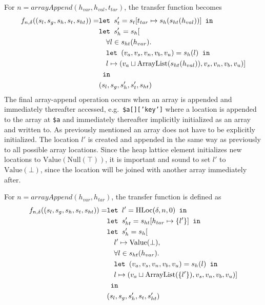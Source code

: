For $n = \mathit{arrayAppend}(h_{var}, h_{val},t_{tar})$, the transfer function becomes
\begin{align}
    f_{n,\delta}((s_l, s_g, s_h, s_t, s_{ht})) = &\texttt{let } s_t' = s_t[t_{tar}\mapsto s_h(s_{ht}(h_{val}))] \texttt{ in }\notag\\
                              &\texttt{let } s_h' = s_h[\notag\\
                              &\quad \forall l \in s_{ht}(h_{var}).\notag\\
                              &\quad\texttt{let } (v_a,v_s,v_n,v_b,v_u) = s_h(l) \texttt{ in } \notag\\
                              &\quad l\mapsto (v_a \sqcup \text{ArrayList}(s_{ht}(h_{val})), v_s, v_n, v_b, v_u)]\notag\\
                              & \texttt{ in }\notag\\
                              &(s_l, s_g, s_h', s_t', s_{ht})
\end{align}
The final array-append operation occurs when an array is appended and immediately thereafter accessed, e.g.\ \texttt{\$a[]['key']} where a location is appended to the array at \texttt{\$a} and immediately  thereafter implicitly initialized as an array and written to. As previously mentioned an array does not have to be explicitly initialized. The location $l'$ is created and appended in the same way as previously to all possible array locations. Since the heap lattice element initializes new locations to $\text{Value}(\text{Null}(\top))$, it is important and sound to set $l'$ to $\text{Value}(\bot)$, since the location will be joined with another array immediately after. 

For $n = \mathit{arrayAppend}(h_{var}, h_{tar})$, the transfer function is defined as
\begin{align}
    f_{n,\delta}((s_l, s_g, s_h, s_t, s_{ht})) = &\texttt{let } l' = \text{HLoc}(\delta, n, 0) \texttt{ in }\notag\\
                              &\texttt{let } s_{ht}' = s_{ht}[h_{tar} \mapsto \{l'\}] \texttt{ in }\notag\\
                              &\texttt{let } s_h' = s_h[\notag\\
                              &\quad l' \mapsto \text{Value}(\bot), \notag\\
                              &\quad \forall l \in s_{ht}(h_{var}).\notag\\
                              &\quad\texttt{let } (v_a,v_s,v_n,v_b,v_u) = s_h(l) \texttt{ in } \notag\\
                              &\quad l\mapsto (v_a \sqcup \text{ArrayList}(\{l'\}), v_s, v_n, v_b, v_u)]\notag\\
                              & \texttt{ in }\notag\\
                              &(s_l, s_g, s_h', s_t, s_{ht}')
\end{align}
\begin{comment}
\begin{program}
\centering
\begin{lstlisting}
$a = [];
$a[]["foo"] = 42;
\end{lstlisting}
\caption{Array append before write}
\label{lst:appendbefw}
\end{program}
\end{comment}
